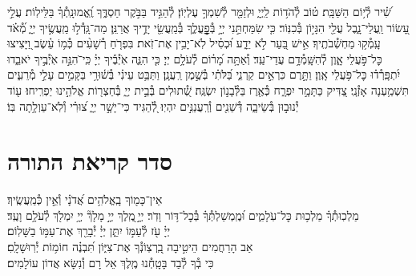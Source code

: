 \documentclass[twoside, openany, parskip=half, 11pt]{book}
\begin{document}
שִׁ֝֗יר לְ֯י֥וֹם הַשַּׁבָּֽת׃
ט֗וֹב לְ֯הֹד֥וֹת לַֽיְיָ֑ וּלְזַמֵּ֖ר לְ֯שִׁמְךָ֣ עֶלְיֽוֹן׃
לְ֯הַגִּ֣יד בַּבֹּ֣קֶר חַסְדֶּ֑ךָ וֶֽ֝אֱמוּנָֽתְ֯ךָ֗ בַּלֵּילֽוֹת׃
עֲלֵ֣י עָ֭שׂוֹר וַֽעֲלֵי־נָ֑בֶל עֲלֵ֖י הִגָּי֣וֹן בְּ֯כִנּֽוֹר׃
כִּ֤י שִׂמַּחְתַּ֣נִי יְיָ֣ בְּ֯פׇׇׇׇׇׇׇׇֽעֳלֶ֑ךָ בְּ֯מַֽעֲשֵׂ֖י יָדֶ֣יךָ אֲרַנֵּֽן׃
מַה־גָּֽדְ֯ל֣וּ מַֽעֲשֶׂ֣יךָ יְיָ֑ מְ֝֯אֹ֗ד עָֽמְ֯ק֥וּ מַחְשְׁ֯בֹתֶֽיךָ׃
אִ֣ישׁ בַּ֭עַר לֹ֣א יֵדָ֑ע וּ֝כְסִ֗יל לֹֽא־יָבִ֥ין אֶת־זֹֽאת׃
בִּפְרֹ֤חַ רְ֯שָׁעִ֨ים כְּ֯מ֥וֹ עֵ֗שֶׂב וַ֭יָּצִיצוּ כׇּל־פֹּ֣עֲלֵי אָ֑וֶן לְ֯הִשָּֽׁמְ֯דָ֥ם עֲדֵי־עַֽד׃
וְ֯אַתָּ֥ה מָ֝ר֗וֹם לְ֯עֹלָ֥ם יְיָ׃
כִּ֤י הִנֵּ֢ה אֹֽיְ֯בֶ֡יךָ יְיָ֗ כִּֽי־ֹהִנֵּ֣ה אֹֽיְ֯בֶ֣יךָ יֹאבֵ֑דוּ יִ֝תְפָּֽרְ֯ד֗וּ כׇּל־פֹּ֥עֲלֵי אָֽוֶן׃
וַתָּ֣רֶם כִּרְאֵ֣ים קַרְנִ֑י בַּ֝לֹּתִ֗י בְּ֯שֶׁ֣מֶן רַֽעֲנָֽן׃
וַתַּבֵּ֥ט עֵינִ֗י בְּ֯שׁ֫וּרָ֥י בַּקָּמִ֣ים עָלַ֣י מְ֯רֵעִ֑ים תִּשְׁמַ֥עְנָה אָזְ֯נָֽי׃
צַ֭דִּיק כַּתָּמָ֣ר יִפְרָ֑ח כְּ֯אֶ֖רֶז בַּלְּ֯בָנ֣וֹן יִשְׂגֶּֽה׃
שְׁ֭֯תוּלִים בְּ֯בֵ֣ית יְיָ֑ בְּ֯חַצְר֖וֹת אֱלֹהֵ֣ינוּ יַפְרִֽיחוּ׃
ע֖וֹד יְ֯נוּב֣וּן בְּ֯שֵׂיבָ֑ה דְּ֯שֵׁנִ֖ים וְ֯רַֽעֲנַנִּ֣ים יִהְיֽוּ׃
לְ֭֯הַגִּיד כִּי־יָשָׁ֣ר יְיָ֑ צ֝וּרִ֗י וְ֯לֹֽא־עַוְלָ֥תָה בּֽוֹ׃\\
\RChBarekhi
\ledavid
\mournerskaddish



\nextpage

\section[סדר קריאת התורה]{ סדר קריאת התורה }

אֵין־כָּמ֖וֹךָ בָֽאֱלֹהִ֥ים אֲ֝דֹנָ֗י וְ֯אֵ֣ין כְּ֯מַֽעֲשֶֽׂיךָ׃
\\
מַלְכֽוּתְ֯ךָ֗ מַלְכ֥וּת כׇּל־עֹֽלָמִ֑ים וּ֝מֶֽמְשַׁלְתְּ֯ךָ֗ בְּ֯כׇל־דּ֥וֹר וָדֹֽר׃
יְיָ֣ ֖מֶֽלֶךְ
יְיָ֣ מָלָךְ֘
יְיָ֥ יִמְלֹ֖ךְ לְ֯עֹלָ֥ם וָעֶֽד׃
\\
יְיָ֗ עֹ֖ז לְ֯עַמּ֣וֹ יִתֵּ֑ן יְיָ֓ יְ֯בָרֵ֖ךְ אֶת־עַמּ֣וֹ בַשָּׁלֽוֹם׃
\\
אַב הָרַחֲמִים הֵיטִ֣יבָה בִֽ֭רְצֽוֹנְ֯ךָ אֶת־צִיּ֑וֹן תִּ֝בְנֶ֗ה חוֹמ֥וֹת יְ֯רֽוּשָׁלָֽםִ׃
\\
כִּי בְ֯ךָ לְ֯בַד בָּטָֽחְ֯נוּ מֶֽלֶךְ אֵל רָם וְ֯נִשָּׂא אֲדוֹן עוֹלָמִים׃





\pesicha
\end{document}
